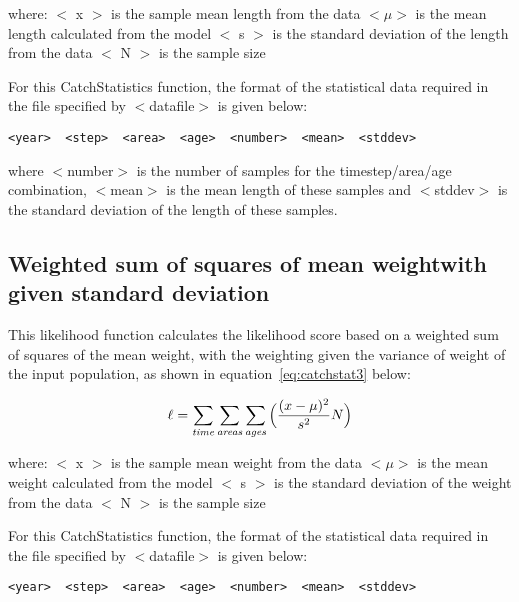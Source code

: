 \documentclass [a4paper, 10pt]{book}
\begin{document}
where:\newline
$<$ x $>$ is the sample mean length from the data\newline
$<\mu>$ is the mean length calculated from the model\newline
$<$ s $>$ is the standard deviation of the length from the data\newline
$<$ N $>$ is the sample size

\bigskip
For this CatchStatistics function, the format of the statistical data required in the file specified by $<$datafile$>$ is given below:

{\small\begin{verbatim}
<year>  <step>  <area>  <age>  <number>  <mean>  <stddev>
\end{verbatim}}

where $<$number$>$ is the number of samples for the timestep/area/age combination, $<$mean$>$ is the mean length of these samples and $<$stddev$>$ is the standard deviation of the length of these samples.

\subsection{Weighted sum of squares of mean weight\newline with given standard deviation}
This likelihood function calculates the likelihood score based on a weighted sum of squares of the mean weight, with the weighting given the variance of weight of the input population, as shown in equation~\ref{eq:catchstat3} below:

\begin{equation}\label{eq:catchstat3}
\ell = \sum_{\it time}\sum_{\it areas}\sum_{\it ages} \Big(\frac{(x-\mu)^2} {s^2} N\Big)
\end{equation}

where:\newline
$<$ x $>$ is the sample mean weight from the data\newline
$<\mu>$ is the mean weight calculated from the model\newline
$<$ s $>$ is the standard deviation of the weight from the data\newline
$<$ N $>$ is the sample size

\bigskip
For this CatchStatistics function, the format of the statistical data required in the file specified by $<$datafile$>$ is given below:

{\small\begin{verbatim}
<year>  <step>  <area>  <age>  <number>  <mean>  <stddev>
\end{verbatim}}
\end{document}
